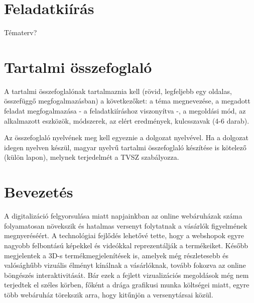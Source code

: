 \documentclass[12pt]{report}
\begin{document}
        \clearpage
        \pagestyle{plain}
        \chapter*{Feladatkiírás}
        \setcounter{page}{2}
        Tématerv?

        \newpage
	    \chapter*{Tartalmi összefoglaló}

            A tartalmi összefoglalónak tartalmaznia kell (rövid, legfeljebb egy oldalas, összefüggő megfogalmazásban)
            a következőket: a téma megnevezése, a megadott feladat megfogalmazása - a feladatkiíráshoz viszonyítva -,
            a megoldási mód, az alkalmazott eszközök, módszerek, az elért eredmények, kulcsszavak (4-6 darab).
            
            Az összefoglaló nyelvének meg kell egyeznie a dolgozat nyelvével. Ha a dolgozat idegen nyelven készül,
            magyar nyelvű tartalmi összefoglaló készítése is kötelező (külön lapon), melynek terjedelmét a TVSZ szabályozza.
            
        \newpage
        \tableofcontents

	
        \chapter*{Bevezetés}

        
        
        A digitalizáció felgyorsulása miatt napjainkban az online webáruházak száma folyamatosan növekszik és hatalmas versenyt folytatnak a vásárlók figyelmének megnyeréséért. A technológiai fejlődés lehetővé tette, hogy a webshopok egyre nagyobb felbontású képekkel és videókkal reprezentálják a termékeiket. Később megjelentek a 3D-s termékmegjelenítések is, amelyek még részletesebb és valósághűbb vizuális élményt kínálnak a vásárlóknak, tovább fokozva az online böngészés interaktivitását.
        Bár ezek a fejlett vizualizációs megoldások még nem terjedtek el széles körben, főként a drága grafikusi munka költségei miatt, egyre több webáruház törekszik arra, hogy kitűnjön a versenytársai közül.
        
\end{document}
